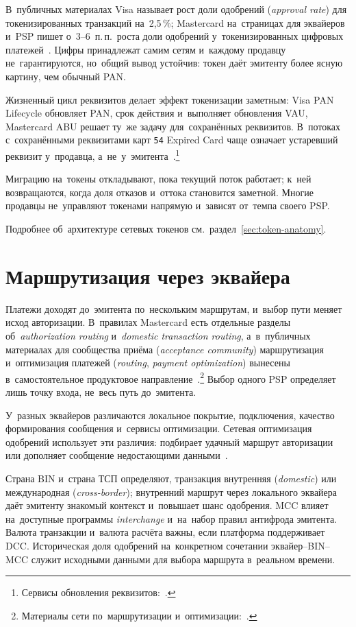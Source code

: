 В~публичных материалах Visa называет рост доли одобрений (\textit{approval
rate}) для токенизированных транзакций на~2{,}5\,\%;
Mastercard на~страницах для эквайеров и~PSP пишет о~3--6~п.\,п.\ роста доли
одобрений у~токенизированных цифровых платежей~\cite{visa-tokenization-security,mc-acquirers-psps}. Цифры
принадлежат самим сетям и~каждому продавцу не~гарантируются, но~общий вывод
устойчив: токен даёт эмитенту более ясную картину, чем обычный PAN.

Жизненный цикл реквизитов делает эффект токенизации заметным: Visa PAN
Lifecycle обновляет PAN, срок действия и~выполняет обновления VAU, Mastercard
ABU решает ту~же задачу для~сохранённых реквизитов. В~потоках с~сохранёнными
реквизитами карт
\texttt{54} Expired Card чаще означает устаревший реквизит у~продавца,
а~не~у~эмитента~\cite{visa-vts}.\footnote{Сервисы обновления реквизитов:~\cite{visa-vau,mc-bill-pay-solutions}.}

Миграцию на~токены откладывают, пока текущий поток работает; к~ней
возвращаются, когда доля отказов и~оттока становится заметной. Многие продавцы
не~управляют токенами напрямую и~зависят от~темпа
своего PSP.

Подробнее об~архитектуре сетевых токенов см.~раздел~\ref{sec:token-anatomy}.

\section{Маршрутизация через эквайера}\label{sec:decline-routing}

Платежи доходят до~эмитента по~нескольким маршрутам, и~выбор пути меняет исход
авторизации. В~правилах Mastercard есть отдельные разделы об~\textit{authorization routing} и~\textit{domestic transaction routing},
а~в~публичных материалах для сообщества приёма (\textit{acceptance community})
маршрутизация и~оптимизация платежей (\textit{routing}, \textit{payment
optimization}) вынесены в~самостоятельное продуктовое
направление~\cite{mc-tpr}.\footnote{Материалы сети по~маршрутизации и~оптимизации:~\cite{mc-acquirers-psps,mc-pop}.} Выбор одного PSP определяет
лишь точку входа, не~весь путь до~эмитента.

У~разных эквайеров различаются локальное покрытие, подключения, качество
формирования сообщения и~сервисы оптимизации. Сетевая оптимизация одобрений
использует эти различия: подбирает удачный маршрут авторизации или дополняет
сообщение недостающими данными~\cite{mc-pop}.

Страна BIN и~страна ТСП определяют, транзакция внутренняя (\textit{domestic})
или международная (\textit{cross-border}); внутренний маршрут через локального
эквайера даёт эмитенту знакомый контекст и~повышает шанс одобрения. MCC влияет
на~доступные программы \textit{interchange} и~на~набор правил антифрода
эмитента. Валюта транзакции и~валюта расчёта важны, если платформа поддерживает
DCC. Историческая доля одобрений на~конкретном сочетании эквайер--BIN--MCC
служит исходными данными для выбора маршрута в~реальном времени.

